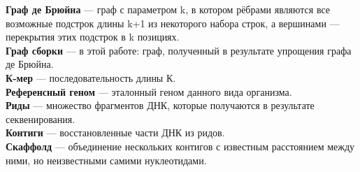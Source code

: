 \documentclass[14pt]{matmex-diploma-custom}
\begin{document}
\textbf{Граф де Брюйна} --- граф с параметром k, в котором рёбрами являются все возможные подстрок длины k+1 из некоторого набора строк, а вершинами --- перекрытия этих подстрок в k позициях.\\

\textbf{Граф сборки} --- в этой работе: граф, полученный в результате упрощения графа де Брюйна.\\

\textbf{К-мер} --- последовательность длины К.\\


\textbf{Референсный геном} --- эталонный геном данного вида организма.\\

\textbf{Риды} --- множество фрагментов ДНК, которые получаются в результате секвенирования.\\

\textbf{Контиги} --- восстановленные части ДНК из ридов.\\

\textbf{Скаффолд} --- объединение нескольких контигов с известным расстоянием между ними, но неизвестными самими нуклеотидами.\\


\setmonofont[Mapping=tex-text]{CMU Typewriter Text}


\end{document}
